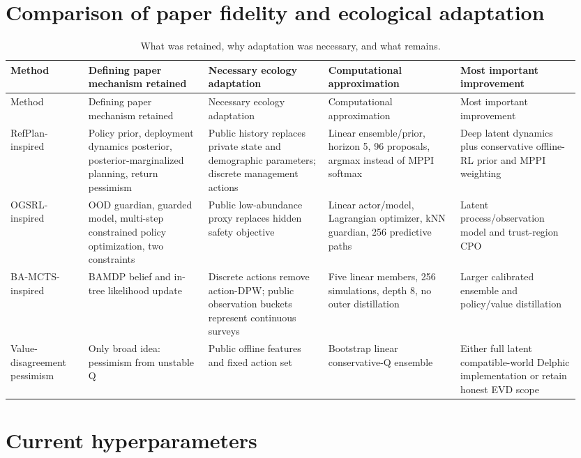\documentclass[11pt,a4paper]{article}
\begin{document}
\section{Comparison of paper fidelity and ecological adaptation}

\begin{landscape}
\begin{longtable}{P{0.13\linewidth}P{0.20\linewidth}P{0.20\linewidth}P{0.22\linewidth}P{0.20\linewidth}}
\caption{What was retained, why adaptation was necessary, and what remains.}\\
\toprule
Method & Defining paper mechanism retained & Necessary ecology adaptation & Computational approximation & Most important improvement \\
\midrule
\endfirsthead
\toprule
Method & Defining paper mechanism retained & Necessary ecology adaptation & Computational approximation & Most important improvement \\
\midrule
\endhead
RefPlan-inspired & Policy prior, deployment dynamics posterior, posterior-marginalized planning, return pessimism & Public history replaces private state and demographic parameters; discrete management actions & Linear ensemble/prior, horizon 5, 96 proposals, argmax instead of MPPI softmax & Deep latent dynamics plus conservative offline-RL prior and MPPI weighting \\
\addlinespace
OGSRL-inspired & OOD guardian, guarded model, multi-step constrained policy optimization, two constraints & Public low-abundance proxy replaces hidden safety objective & Linear actor/model, Lagrangian optimizer, kNN guardian, 256 predictive paths & Latent process/observation model and trust-region CPO \\
\addlinespace
BA-MCTS-inspired & BAMDP belief and in-tree likelihood update & Discrete actions remove action-DPW; public observation buckets represent continuous surveys & Five linear members, 256 simulations, depth 8, no outer distillation & Larger calibrated ensemble and policy/value distillation \\
\addlinespace
Value-disagreement pessimism & Only broad idea: pessimism from unstable Q & Public offline features and fixed action set & Bootstrap linear conservative-Q ensemble & Either full latent compatible-world Delphic implementation or retain honest EVD scope \\
\bottomrule
\end{longtable}
\end{landscape}

\section{Current hyperparameters}
\end{document}
